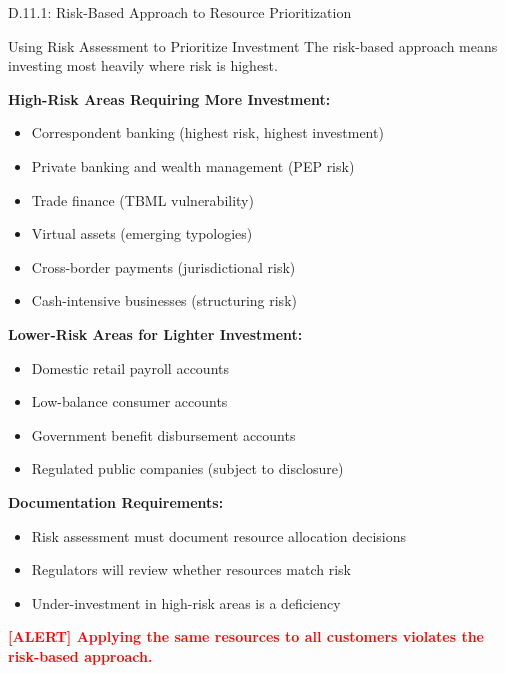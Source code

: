 \documentclass[11pt,a4paper]{beamer}
\newcommand{\redflag}[1]{\textcolor{red}{\textbf{[ALERT] #1}}}
\begin{document}
\begin{frame}{D.11.1: Risk-Based Approach to Resource Prioritization}
	\begin{block}{Using Risk Assessment to Prioritize Investment}
		The risk-based approach means investing most heavily where risk is highest.
	\end{block}
	\textbf{High-Risk Areas Requiring More Investment:}
	\begin{itemize}
		\item Correspondent banking (highest risk, highest investment)
		\item Private banking and wealth management (PEP risk)
		\item Trade finance (TBML vulnerability)
		\item Virtual assets (emerging typologies)
		\item Cross-border payments (jurisdictional risk)
		\item Cash-intensive businesses (structuring risk)
	\end{itemize}
	\textbf{Lower-Risk Areas for Lighter Investment:}
	\begin{itemize}
		\item Domestic retail payroll accounts
		\item Low-balance consumer accounts
		\item Government benefit disbursement accounts
		\item Regulated public companies (subject to disclosure)
	\end{itemize}
	\textbf{Documentation Requirements:}
	\begin{itemize}
		\item Risk assessment must document resource allocation decisions
		\item Regulators will review whether resources match risk
		\item Under-investment in high-risk areas is a deficiency
	\end{itemize}
	\redflag{Applying the same resources to all customers violates the risk-based approach.}
\end{frame}

\end{document}

